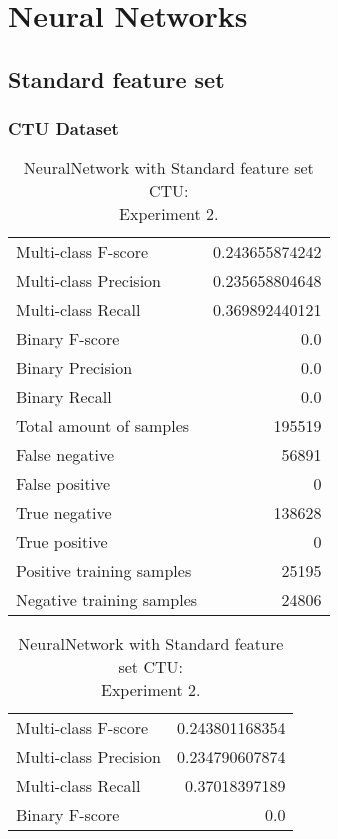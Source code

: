 
\chapter{Neural Networks} %

\section{Standard feature set}
\subsection{CTU Dataset}


\begin{table}[H]
\begin{minipage}{0.5\textwidth}
\caption{NeuralNetwork with Standard feature set CTU: \\Experiment 1.}
\centering
\begin{tabular}{l r}
\toprule
Multi-class F-score & 0.243655874242 \\
Multi-class Precision & 0.235658804648 \\
Multi-class Recall & 0.369892440121 \\
\midrule
Binary F-score & 0.0 \\
Binary Precision & 0.0 \\
Binary Recall & 0.0 \\
\midrule
Total amount of samples & 195519 \\
False negative & 56891 \\
False positive & 0 \\
True negative & 138628 \\
True positive & 0 \\
\midrule
Positive training samples & 25195 \\
Negative training samples & 24806 \\
\bottomrule
\end{tabular}
\end{minipage}
\hfillx
\begin{minipage}{0.5\textwidth}
\caption{NeuralNetwork with Standard feature set CTU: \\Experiment 2.}
\centering
\begin{tabular}{l r}
\toprule
Multi-class F-score & 0.243801168354 \\
Multi-class Precision & 0.234790607874 \\
Multi-class Recall & 0.37018397189 \\
\midrule
Binary F-score & 0.0 \\

\end{tabular}
\end{minipage}
\end{table}

